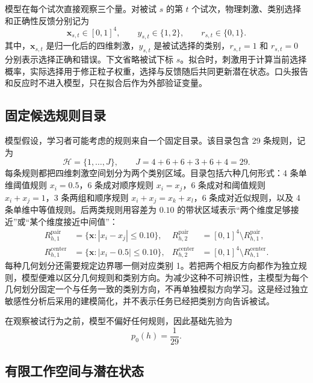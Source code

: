 \documentclass[12pt]{article}
\begin{document}
模型在每个试次直接观察三个量。对被试 $s$ 的第 $t$ 个试次，物理刺激、类别选择和正确性反馈分别记为
\begin{equation}
\bm x_{s,t}\in[0,1]^4,
\qquad
y_{s,t}\in\{1,2\},
\qquad
r_{s,t}\in\{0,1\}.
\label{eq:observations}
\end{equation}
其中，$\bm x_{s,t}$ 是归一化后的四维刺激，$y_{s,t}$ 是被试选择的类别，$r_{s,t}=1$ 和 $r_{s,t}=0$ 分别表示选择正确和错误。下文省略被试下标 $s$。拟合时，刺激用于计算当前选择概率，实际选择用于修正粒子权重，选择与反馈随后共同更新潜在状态。口头报告和反应时不进入模型，只在拟合后作为外部验证变量。

\subsection{固定候选规则目录}

模型假设，学习者可能考虑的规则来自一个固定目录。该目录包含 29 条规则，记为
\begin{equation}
\mathcal H=\{1,\ldots,J\},
\qquad
J=4+6+6+3+6+4=29.
\label{eq:rule-space}
\end{equation}
每条规则都把四维刺激空间划分为两个类别区域。目录包括六种几何形式：4 条单维阈值规则 $x_i=0.5$，6 条成对顺序规则 $x_i=x_j$，6 条成对和阈值规则 $x_i+x_j=1$，3 条两组和顺序规则 $x_i+x_j=x_k+x_l$，6 条成对近似规则，以及 4 条单维中等值规则。后两类规则用容差为 $0.10$ 的带状区域表示“两个维度足够接近”或“某个维度接近中间值”：
\begin{align}
R_{h,1}^{\mathrm{pair}}
&=\{\bm x:|x_i-x_j|\leq0.10\},
&
R_{h,2}^{\mathrm{pair}}
&=[0,1]^4\setminus R_{h,1}^{\mathrm{pair}},
\nonumber\\
R_{h,1}^{\mathrm{center}}
&=\{\bm x:|x_i-0.5|\leq0.10\},
&
R_{h,2}^{\mathrm{center}}
&=[0,1]^4\setminus R_{h,1}^{\mathrm{center}}.
\label{eq:band-rules}
\end{align}
每种几何划分还需要规定边界哪一侧对应类别 1。若把两个相反方向都作为独立规则，模型便难以区分几何规则和类别方向。为减少这种不可辨识性，主模型为每个几何划分固定一个与任务一致的类别方向，不再单独模拟方向学习。这是经过独立敏感性分析后采用的建模简化，并不表示任务已经把类别方向告诉被试。

在观察被试行为之前，模型不偏好任何规则，因此基础先验为
\begin{equation}
p_0(h)=\frac{1}{29}.
\label{eq:base-prior}
\end{equation}

\subsection{有限工作空间与潜在状态}
\end{document}
